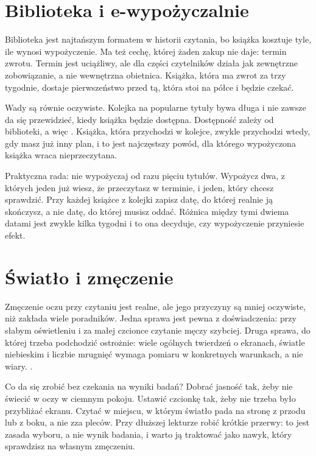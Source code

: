 \section{Biblioteka i e-wypożyczalnie}

Biblioteka jest najtańszym formatem w historii czytania, bo książka kosztuje tyle, ile wynosi wypożyczenie. Ma też cechę, której żaden zakup nie daje: termin zwrotu. Termin jest uciążliwy, ale dla części czytelników działa jak zewnętrzne zobowiązanie, a nie wewnętrzna obietnica. Książka, która ma zwrot za trzy tygodnie, dostaje pierwszeństwo przed tą, która stoi na półce i będzie czekać.

Wady są równie oczywiste. Kolejka na popularne tytuły bywa długa i nie zawsze da się przewidzieć, kiedy książka będzie dostępna. Dostępność zależy od biblioteki, a więc . Książka, która przychodzi w kolejce, zwykle przychodzi wtedy, gdy masz już inny plan, i to jest najczęstszy powód, dla którego wypożyczona książka wraca nieprzeczytana.

Praktyczna rada: nie wypożyczaj od razu pięciu tytułów. Wypożycz dwa, z których jeden już wiesz, że przeczytasz w terminie, i jeden, który chcesz sprawdzić. Przy każdej książce z kolejki zapisz datę, do której realnie ją skończysz, a nie datę, do której musisz oddać. Różnica między tymi dwiema datami jest zwykle kilka tygodni i to ona decyduje, czy wypożyczenie przyniesie efekt.

\section{Światło i zmęczenie}

Zmęczenie oczu przy czytaniu jest realne, ale jego przyczyny są mniej oczywiste, niż zakłada wiele poradników. Jedna sprawa jest pewna z doświadczenia: przy słabym oświetleniu i za małej czcionce czytanie męczy szybciej. Druga sprawa, do której trzeba podchodzić ostrożnie: wiele ogólnych twierdzeń o ekranach, światle niebieskim i liczbie mrugnięć wymaga pomiaru w konkretnych warunkach, a nie wiary. .

Co da się zrobić bez czekania na wyniki badań? Dobrać jasność tak, żeby nie świecić w oczy w ciemnym pokoju. Ustawić czcionkę tak, żeby nie trzeba było przybliżać ekranu. Czytać w miejscu, w którym światło pada na stronę z przodu lub z boku, a nie zza pleców. Przy dłuższej lekturze robić krótkie przerwy: to jest zasada wyboru, a nie wynik badania, i warto ją traktować jako nawyk, który sprawdzisz na własnym zmęczeniu.

